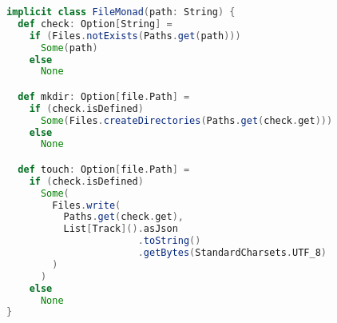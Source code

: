 \usepackage{listings}\begin{lstlisting}[language=Scala, caption=Monade per le operazioni di setup, label=lst:setup]
implicit class FileMonad(path: String) {
  def check: Option[String] =
    if (Files.notExists(Paths.get(path)))
      Some(path)
    else
      None

  def mkdir: Option[file.Path] =
    if (check.isDefined)
      Some(Files.createDirectories(Paths.get(check.get)))
    else
      None

  def touch: Option[file.Path] =
    if (check.isDefined)
      Some(
        Files.write(
          Paths.get(check.get),
          List[Track]().asJson
                       .toString()
                       .getBytes(StandardCharsets.UTF_8)
        )
      )
    else
      None
}
\end{lstlisting}